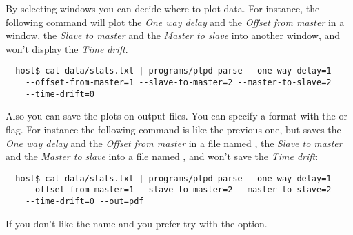             By selecting windows you can decide where to plot data. For
            instance, the following command will plot the \emph{One way
            delay} and the \emph{Offset from master} in a window,
            the \emph{Slave to master} and the \emph{Master to slave} into
            another window, and won't display the \emph{Time drift}.
\begin{lstlisting}
  host$ cat data/stats.txt | programs/ptpd-parse --one-way-delay=1
    --offset-from-master=1 --slave-to-master=2 --master-to-slave=2
    --time-drift=0
\end{lstlisting}

            Also you can save the plots on output files. You can specify a
            format with the  or  flag. For instance
            the following command is like the previous one, but saves
            the \emph{One way delay} and the \emph{Offset from master} in
            a file named , the \emph{Slave to
            master} and the \emph{Master to slave} into a file named
            , and won't save the \emph{Time
            drift}:
\begin{lstlisting}
  host$ cat data/stats.txt | programs/ptpd-parse --one-way-delay=1
    --offset-from-master=1 --slave-to-master=2 --master-to-slave=2
    --time-drift=0 --out=pdf
\end{lstlisting}
            If you don't like the name  and you
            prefer  try with the
             option.

